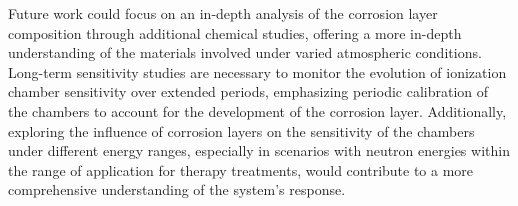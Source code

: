 Future work could focus on an in-depth analysis of the corrosion layer composition through additional chemical studies, offering a more in-depth understanding of the materials involved under varied atmospheric conditions. Long-term sensitivity studies are necessary to monitor the evolution of ionization chamber sensitivity over extended periods, emphasizing periodic calibration of the chambers to account for the development of the corrosion layer. Additionally, exploring the influence of corrosion layers on the sensitivity of the chambers under different energy ranges, especially in scenarios with neutron energies within the range of application for therapy treatments, would contribute to a more comprehensive understanding of the system's response.
